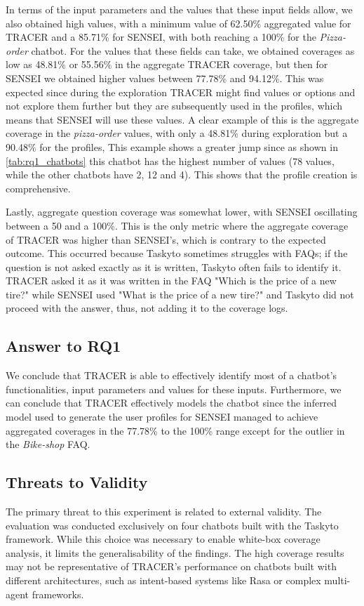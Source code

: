 In terms of the input parameters and
the values that these input fields allow,
we also obtained high values,
with a minimum value of 62.50\% aggregated value for TRACER
and a 85.71\% for SENSEI,
with both reaching a 100\% for the \textit{Pizza-order} chatbot.
For the values that these fields can take, we obtained
coverages as low as 48.81\% or 55.56\% in the aggregate \ac{TRACER} coverage,
but then for SENSEI we obtained higher values between 77.78\% and 94.12\%.
This was expected since during the exploration
TRACER might find values or options and not explore them further
but they are subsequently used in the profiles,
which means that SENSEI will use these values.
A clear example of this is the aggregate coverage in the \textit{pizza-order} values,
with only a 48.81\% during exploration but a 90.48\% for the profiles,
This example shows a greater jump since as shown in \autoref{tab:rq1_chatbots}
this chatbot has the highest number of values
(78 values, while the other chatbots have 2, 12 and 4).
This shows that the profile creation is comprehensive.

Lastly, aggregate question coverage was somewhat lower,
with SENSEI oscillating between a 50 and a 100\%.
This is the only metric where the aggregate coverage of TRACER
was higher than SENSEI's, which is contrary to the expected outcome.
This occurred because Taskyto sometimes struggles with FAQs;
if the question is not asked exactly as it is written,
Taskyto often fails to identify it.
\ac{TRACER} asked it as it was written in the FAQ
"Which is the price of a new tire?"
while SENSEI used "What is the price of a new tire?"
and Taskyto did not proceed with the answer, thus,
not adding it to the coverage logs.

\subsection{Answer to RQ1}

We conclude that \ac{TRACER} is able to effectively identify
most of a chatbot's functionalities, input parameters and values for these inputs.
Furthermore, we can conclude that TRACER effectively models the chatbot
since the inferred model used to generate the user profiles for SENSEI
managed to achieve aggregated coverages in the 77.78\% to the 100\% range
except for the outlier in the \textit{Bike-shop} FAQ.

\subsection{Threats to Validity}
The primary threat to this experiment
is related to external validity.
The evaluation was conducted exclusively
on four chatbots built with the Taskyto framework.
While this choice was necessary
to enable white-box coverage analysis,
it limits the generalisability of the findings.
The high coverage results
may not be representative of TRACER's performance
on chatbots built with different architectures,
such as intent-based systems like Rasa
or complex multi-agent frameworks.
